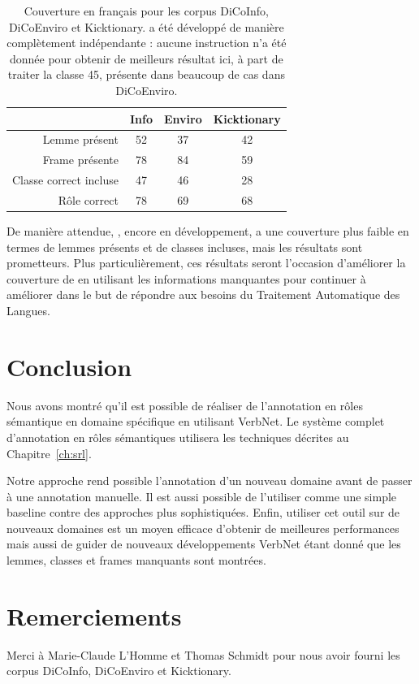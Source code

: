 \begin{table}[h]
\centering
\begin{tabular}{rccc}
  \toprule
         & Info & Enviro & Kicktionary \\
  \midrule
  Lemme présent          & 52 & 37 & 42 \\
  Frame présente         & 78 & 84 & 59 \\
  Classe correct incluse & 47 & 46 & 28 \\
  Rôle correct           & 78 & 69 & 68 \\
  \bottomrule
\end{tabular}

\caption{\label{table:coverage} Couverture \verbenet{} en français pour les
corpus DiCoInfo, DiCoEnviro et Kicktionary. \verbenet{} a été développé de
manière complètement indépendante : aucune instruction n'a été donnée pour
obtenir de meilleurs résultat ici, à part de traiter la classe 45, présente
dans beaucoup de cas dans DiCoEnviro.}
\end{table}

De manière attendue, \verbenet{}, encore en développement, a une couverture
plus faible en termes de lemmes présents et de classes incluses, mais les
résultats sont prometteurs. Plus particulièrement, ces résultats seront
l'occasion d'améliorer la couverture de \verbenet{} en utilisant les
informations manquantes pour continuer à améliorer \verbenet{} dans le but de
répondre aux besoins du Traitement Automatique des Langues.

\section*{Conclusion}

Nous avons montré qu'il est possible de réaliser de l'annotation en rôles
sémantique en domaine spécifique en utilisant VerbNet. Le système complet
d'annotation en rôles sémantiques utilisera les techniques décrites au
Chapitre~\ref{ch:srl}.

Notre approche rend possible l'annotation d'un nouveau domaine avant de passer
à une annotation manuelle. Il est aussi possible de l'utiliser comme une simple
baseline contre des approches plus sophistiquées. Enfin, utiliser cet outil sur
de nouveaux domaines est un moyen efficace d'obtenir de meilleures performances
mais aussi de guider de nouveaux développements VerbNet étant donné que les
lemmes, classes et frames manquants sont montrées.


\section*{Remerciements}

Merci à Marie-Claude L'Homme et Thomas Schmidt pour nous avoir fourni les
corpus DiCoInfo, DiCoEnviro et Kicktionary.
